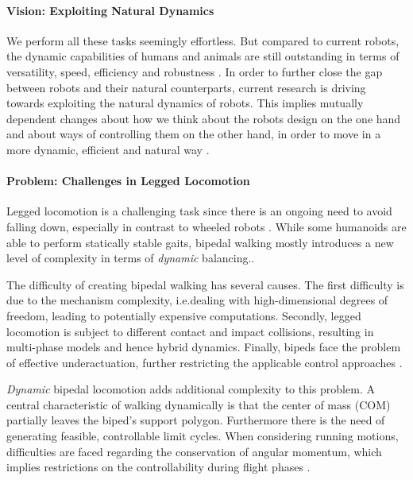 \paragraph{Vision: Exploiting Natural Dynamics}
We perform all these tasks seemingly effortless. But compared to current robots, the dynamic capabilities of humans and animals are still outstanding in terms of versatility, speed, efficiency and robustness \cite{hutter2012starleth}. In order to further close the gap between robots and their natural counterparts, current research is driving towards exploiting the natural dynamics of robots. This implies mutually dependent changes about how we think about the robots design \cite{pratt2004series} on the one hand and about ways of controlling them on the other hand, in order to move in a more dynamic, efficient and natural way \cite{collins2005efficient, haddadin2012optimal, pratt2000exploiting}.

\paragraph{Problem: Challenges in Legged Locomotion}
Legged locomotion is a challenging task since there is an ongoing need to avoid falling down, especially in contrast to wheeled robots \cite{raibert1986legged}. While some humanoids are able to perform statically stable gaits, bipedal walking mostly introduces a new level of complexity in terms of \textit{dynamic} balancing.\cite[Ch.\ 67]{siciliano2016springer}. 

The difficulty of creating bipedal walking has several causes. The first difficulty is due to the mechanism complexity, i.e.dealing with high-dimensional degrees of freedom, leading to potentially expensive computations. Secondly, legged locomotion is subject to different contact and impact collisions, resulting in multi-phase models and hence hybrid dynamics. Finally, bipeds face the problem of effective underactuation, further restricting the applicable control approaches \cite[Ch.\ 1]{westervelt2018feedback}.

\textit{Dynamic} bipedal locomotion adds additional complexity to this problem. A central characteristic of walking dynamically is that the center of mass (COM) partially leaves the biped's support polygon. Furthermore there is the need of generating feasible, controllable limit cycles. When considering running motions, difficulties are faced regarding the conservation of angular momentum, which implies restrictions on the controllability during flight phases \cite[Ch.\ 1]{westervelt2018feedback}. 



